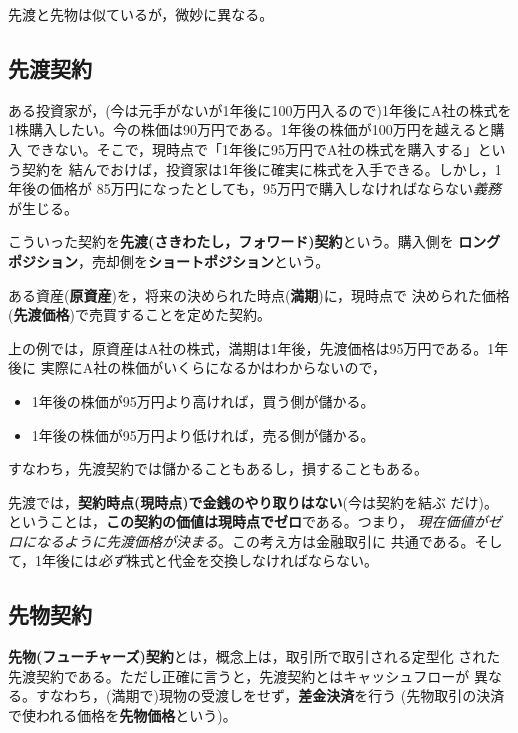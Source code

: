 先渡と先物は似ているが，微妙に異なる。

\subsection{先渡契約}

\begin{example}
ある投資家が，(今は元手がないが1年後に100万円入るので)1年後にA社の株式を
1株購入したい。今の株価は90万円である。1年後の株価が100万円を越えると購入
できない。そこで，現時点で「1年後に95万円でA社の株式を購入する」という契約を
結んでおけば，投資家は1年後に確実に株式を入手できる。しかし，1年後の価格が
85万円になったとしても，95万円で購入しなければならない\emph{義務}が生じる。
\end{example}

こういった契約を\textbf{先渡(さきわたし，フォワード)契約}という。購入側を
\textbf{ロングポジション}，売却側を\textbf{ショートポジション}という。

\begin{definition}[先渡契約]
ある資産(\textbf{原資産})を，将来の決められた時点(\textbf{満期})に，現時点で
決められた価格(\textbf{先渡価格})で売買することを定めた契約。
\end{definition}

上の例では，原資産はA社の株式，満期は1年後，先渡価格は95万円である。1年後に
実際にA社の株価がいくらになるかはわからないので，
\begin{itemize}
\item 1年後の株価が95万円より高ければ，買う側が儲かる。
\item 1年後の株価が95万円より低ければ，売る側が儲かる。
\end{itemize}
すなわち，先渡契約では儲かることもあるし，損することもある。

\begin{keypoint}[先渡価格の決まり方]
先渡では，\textbf{契約時点(現時点)で金銭のやり取りはない}(今は契約を結ぶ
だけ)。ということは，\textbf{この契約の価値は現時点でゼロ}である。つまり，
\emph{現在価値がゼロになるように先渡価格が決まる}。この考え方は金融取引に
共通である。そして，1年後には\emph{必ず}株式と代金を交換しなければならない。
\end{keypoint}

\subsection{先物契約}

\begin{definition}[先物契約]
\textbf{先物(フューチャーズ)契約}とは，概念上は，取引所で取引される定型化
された先渡契約である。ただし正確に言うと，先渡契約とはキャッシュフローが
異なる。すなわち，(満期で)現物の受渡しをせず，\textbf{差金決済}を行う
(先物取引の決済で使われる価格を\textbf{先物価格}という)。
\end{definition}

